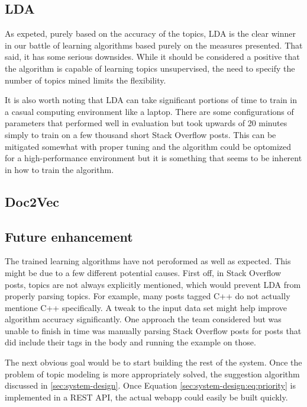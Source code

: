 \subsection{LDA}
\label{sec:conc:lda}
As expeted, purely based on the accuracy of the topics, LDA is the
clear winner in our battle of learning algorithms based purely on the
measures presented.
That said, it has some serious downsides.
While it should be considered a positive that the algorithm is capable
of learning topics unsupervised, the need to specify the number of
topics mined limits the flexibility.

It is also worth noting that LDA can take significant portions of time
to train in a casual computing environment like a laptop.
There are some configurations of parameters that performed well in
evaluation but took upwards of 20 minutes simply to train on a few
thousand short Stack Overflow posts.
This can be mitigated somewhat with proper tuning and the algorithm
could be optomized for a high-performance environment but it is
something that seems to be inherent in how to train the algorithm.

% 
\subsection{Doc2Vec}
\label{sec:conc:doc2vec}



\subsection{Future enhancement}
The trained learning algorithms have not peroformed as well as
expected.
This might be due to a few different potential causes.
First off, in Stack Overflow posts, topics are not always explicitly
mentioned, which would prevent LDA from properly parsing topics.
For example, many posts tagged C++ do not actually mentione C++
specifically.
A tweak to the input data set might help improve algorithm accuracy
significantly.
One approach the team considered but was unable to finish in time was
manually parsing Stack Overflow posts for posts that did include their
tags in the body and running the example on those.  

The next obvious goal would be to start building the rest of the
system.
Once the problem of topic modeling is more appropriately solved, the
suggestion algorithm discussed in \ref{sec:system-design}.
Once Equation \ref{sec:system-design:eq:priority} is implemented in a REST API, the
actual webapp could easily be built quickly.  

